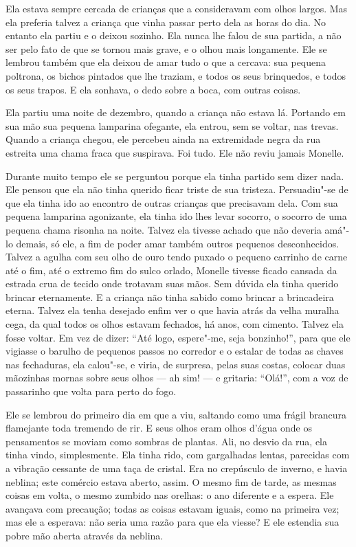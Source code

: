 Ela estava sempre cercada de crianças que a consideravam com olhos
largos. Mas ela preferia talvez a criança que vinha passar perto dela as
horas do dia. No entanto ela partiu e o deixou sozinho. Ela nunca lhe
falou de sua partida, a não ser pelo fato de que se tornou mais grave, e o
olhou mais longamente. Ele se lembrou também que ela deixou de amar tudo o
que a cercava: sua pequena poltrona, os bichos pintados que lhe traziam, e
todos os seus brinquedos, e todos os seus trapos. E ela sonhava, o dedo
sobre a boca, com outras coisas.

Ela partiu uma noite de dezembro, quando a criança não estava lá.
Portando em sua mão sua pequena lamparina ofegante, ela entrou, sem se
voltar, nas trevas. Quando a criança chegou, ele percebeu ainda na
extremidade negra da rua estreita uma chama fraca que suspirava. Foi tudo.
Ele não reviu jamais Monelle.

Durante muito tempo ele se perguntou porque ela tinha partido sem
dizer nada. Ele pensou que ela não tinha querido ficar triste de sua
tristeza. Persuadiu"-se de que ela tinha ido ao encontro de outras crianças
que precisavam dela. Com sua pequena lamparina agonizante, ela tinha ido
lhes levar socorro, o socorro de uma pequena chama risonha na noite.
Talvez ela tivesse achado que não deveria amá"-lo demais, só ele, a fim de
poder amar também outros pequenos desconhecidos. Talvez a agulha com seu
olho de ouro tendo puxado o pequeno carrinho de carne até o fim, até o
extremo fim do sulco orlado, Monelle tivesse ficado cansada da estrada
crua de tecido onde trotavam suas mãos. Sem dúvida ela tinha querido
brincar eternamente. E a criança não tinha sabido como brincar a
brincadeira eterna. Talvez ela tenha desejado enfim ver o que havia atrás
da velha muralha cega, da qual todos os olhos estavam fechados, há anos,
com cimento. Talvez ela fosse voltar. Em vez de dizer: “Até logo,
espere"-me, seja bonzinho!”, para que ele vigiasse o barulho de pequenos
passos no corredor e o estalar de todas as chaves nas fechaduras, ela
calou"-se, e viria, de surpresa, pelas suas costas, colocar duas mãozinhas
mornas sobre seus olhos --- ah sim! --- e gritaria: “Olá!”, com a voz de
passarinho que volta para perto do fogo.

Ele se lembrou do primeiro dia em que a viu, saltando como uma frágil
brancura flamejante toda tremendo de rir. E seus olhos eram olhos d'água
onde os pensamentos se moviam como sombras de plantas. Ali, no desvio da
rua, ela tinha vindo, simplesmente. Ela tinha rido, com gargalhadas
lentas, parecidas com a vibração cessante de uma taça de cristal. Era no
crepúsculo de inverno, e havia neblina; este comércio estava aberto, assim. O
mesmo fim de tarde, as mesmas coisas em volta, o mesmo zumbido nas orelhas: o ano
diferente e a espera. Ele avançava com precaução; todas as coisas estavam
iguais, como na primeira vez; mas ele a esperava: não seria uma razão para
que ela viesse? E ele estendia sua pobre mão aberta através da neblina.


